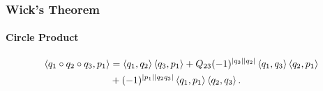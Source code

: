 \documentclass{beamer}
\begin{document}
\begin{frame}

\frametitle{Wick's Theorem}

\framesubtitle{Circle Product}

%
%
%


\begin{align*}
\left\langle q_1 \circ q_2 \circ q_3, p_1 \right\rangle &= \left\langle q_1, q_2 \right\rangle \left\langle q_3, p_1 \right\rangle + Q_{23} (-1)^{| q_3 | | q_2 |} \left\langle q_1, q_3 \right\rangle \left\langle q_2, p_1 \right\rangle \\
&+ (-1)^{| p_1 | | q_2 q_3 | } \left\langle q_1, p_1 \right\rangle \left\langle q_2, q_3 \right\rangle.
\end{align*}

\bigskip

\bigskip


\end{frame}
\end{document}
